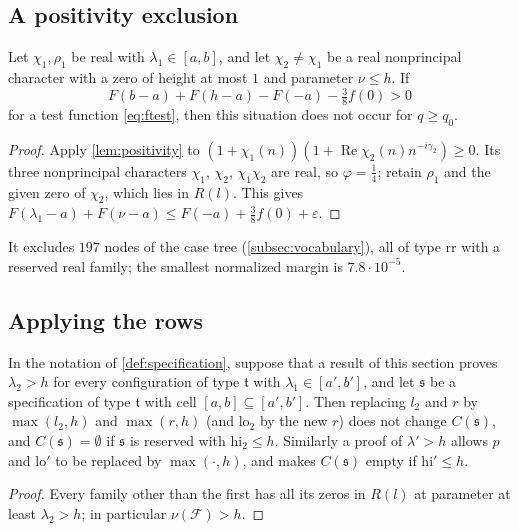 \documentclass[11pt]{amsart}
\numberwithin{equation}{section}
\theoremstyle{plain}
\theoremstyle{definition}
\theoremstyle{remark}
\renewcommand{\Re}{\operatorname{Re}}
\newcommand{\eps}{\varepsilon}
\newcommand{\lo}{\mathrm{lo}}
\newcommand{\hi}{\mathrm{hi}}
\newcommand{\1}{\mathbf{1}}
\begin{document}
\subsection{A positivity exclusion}

\begin{proposition}\label{prop:positivity}
Let $\chi_1,\rho_1$ be real with $\lambda_1\in[a,b]$, and let $\chi_2\ne\chi_1$ be a real nonprincipal
character with a zero of height at most $1$ and parameter $\nu\le h$. If
\[
  F(b-a)+F(h-a)-F(-a)-\tfrac38f(0)>0
\]
for a test function \eqref{eq:ftest}, then this situation does not occur for $q\ge q_0$.
\end{proposition}

\begin{proof}
Apply \cref{lem:positivity} to $(1+\chi_1(n))(1+\Re\chi_2(n)n^{-i\gamma_2})\ge0$. Its three nonprincipal
characters $\chi_1$, $\chi_2$, $\chi_1\chi_2$ are real, so $\varphi=\frac14$; retain $\rho_1$ and the given zero of
$\chi_2$, which lies in $R(l)$. This gives $F(\lambda_1-a)+F(\nu-a)\le F(-a)+\frac38f(0)+\eps$.
\end{proof}

It excludes $197$ nodes of the case tree (\cref{subsec:vocabulary}), all of type $\mathrm{rr}$ with
a reserved real family; the smallest normalized margin is $7.8\cdot10^{-5}$.

\subsection{Applying the rows}

\begin{lemma}\label{lem:updates}
In the notation of \cref{def:specification}, suppose that a result of this section proves $\lambda_2>h$ for every configuration of type $\mathfrak t$ with
$\lambda_1\in[a',b']$, and let $\mathfrak s$ be a specification of type $\mathfrak t$ with cell $[a,b]\subseteq[a',b']$.
Then replacing $l_2$ and $r$ by $\max(l_2,h)$ and $\max(r,h)$ (and $\lo_2$ by the new $r$) does not
change $C(\mathfrak s)$, and $C(\mathfrak s)=\emptyset$ if $\mathfrak s$ is reserved with $\hi_2\le h$. Similarly a proof of
$\lambda'>h$ allows $p$ and $\lo'$ to be replaced by $\max(\cdot,h)$, and makes $C(\mathfrak s)$ empty if
$\hi'\le h$.
\end{lemma}

\begin{proof}
Every family other than the first has all its zeros in $R(l)$ at parameter at least $\lambda_2>h$; in
particular $\nu(\mathcal F)>h$.
\end{proof}
\end{document}
